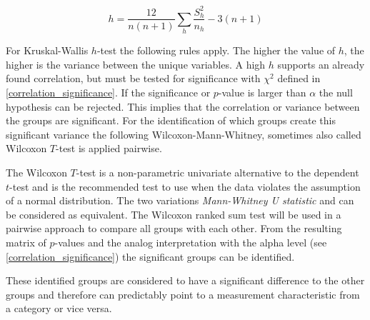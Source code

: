 \smallskip
\begin{equation}
\label{formula_kruskal_wallis}	
	h = \frac{12}{n(n+1)}\sum_{h}{\frac{S_h^2}{n_h}}-3(n+1)
\end{equation}

\medskip

For Kruskal-Wallis $h$-test the following rules apply. The higher the value of $h$, the higher is the variance between the unique variables. A high $h$ supports an already found correlation, but must be tested for significance with $\chi^2$ defined in \cref{correlation_significance}. If the significance or $p$-value is larger than $\alpha$ the null hypothesis can be rejected. This implies that the correlation or variance between the groups are significant. For the identification of which groups create this significant variance the following Wilcoxon-Mann-Whitney, sometimes also called Wilcoxon $T$-test is applied pairwise.

The Wilcoxon $T$-test is a non-parametric univariate alternative to the dependent $t$-test and is the recommended test to use when the data violates the assumption of a normal distribution. The two variations \textit{Mann-Whitney U statistic} and  can be considered as equivalent. The Wilcoxon ranked sum test will be used in a pairwise approach to compare all groups with each other. From the resulting matrix of $p$-values and the analog interpretation with the alpha level (see \cref{correlation_significance}) the significant groups can be identified.

These identified groups are considered to have a significant difference to the other groups and therefore can predictably point to a measurement characteristic from a category or vice versa.




